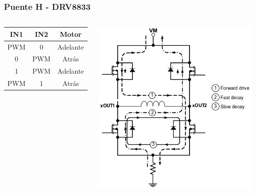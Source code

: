 \documentclass[compress]{beamer}
\begin{document}
\begin{frame}
 \frametitle{Puente H - DRV8833}
\begin{columns} 
{%
\begin{center}
\begin{tabular}{|c|c|c|}\hline
\textbf{IN1} & \textbf{IN2} & \textbf{Motor} \\ \hline
PWM & 0 & Adelante\\ \hline
0 & PWM & Atrás\\ \hline
1 & PWM & Adelante\\ \hline
PWM & 1 & Atrás\\ \hline
\end{tabular}
\end{center}
}%
 \begin{center}
 \includegraphics[width=\columnwidth]{./img/drv8833.png}
\end{center}
\end{columns}
\end{frame}
\end{document}
